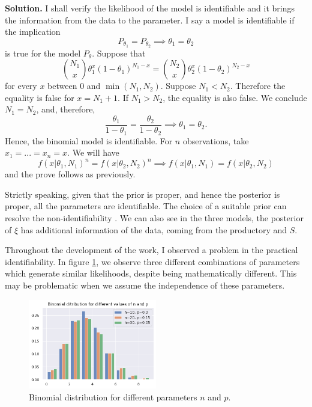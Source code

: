 \vspace{2ex}

    {\bf Solution.} I shall verify the likelihood of the model is identifiable
    and it brings the information from the data to the parameter. I say a
    model is identifiable if the implication 
    $$P_{\theta_1} = P_{\theta_2}
    \implies \theta_1 = \theta_2$$ 
    is true for the model $P_{\theta}$. Suppose that 
    $$
    \binom{N_1}{x} \theta_1^x(1 - \theta_1)^{N_1-x} = \binom{N_2}{x} \theta_2^x(1 - \theta_2)^{N_2-x} 
    $$
    for every $x$ between $0$ and $\min(N_1, N_2)$. Suppose $N_1 < N_2$.
    Therefore the equality is false for $x = N_1 + 1$. If $N_1 > N_2$, the
    equality is also false. We conclude $N_1 = N_2$, and, therefore, 
    $$
    \frac{\theta_1}{1- \theta_1} = \frac{\theta_2}{1- \theta_2}  \implies \theta_1 = \theta_2.   
    $$
    Hence, the binomial model is identifiable. For $n$ observations, take $x_1
    = ... = x_n = x$. We will have
    $$
    f(x|\theta_1, N_1)^n = f(x|\theta_2, N_2)^n \implies f(x|\theta_1, N_1) = f(x|\theta_2, N_2) 
    $$
    and the prove follows as previously. 

    \ind Strictly speaking, given that the prior is proper, and hence the posterior
    is proper, all the parameters are identifiable. The choice of a suitable
    prior can resolve the non-identifiability \cite[]{xie2006}. We can also see
    in the three models, the posterior of $\xi$ has additional information of
    the data, coming from the productory and $S$.

    \begin{remark}
        Throughout the development of the work, I observed a problem in the
        practical identifiability. In figure \ref{fig:binomial-distribution},
        we observe three different combinations of parameters which generate
        similar likelihoods, despite being mathematically different. This may
        be problematic when we assume the independence of these parameters.
    \end{remark}

\begin{figure}[!hb]
    \centering
    \includegraphics[width=0.5\textwidth]{../../images/binomial-distribution.png}
    \caption{Binomial distribution for different parameters $n$ and $p$.}
    \label{fig:binomial-distribution}
\end{figure}